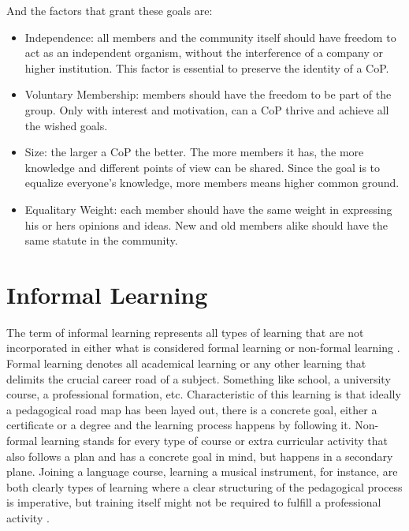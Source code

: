 And the factors that grant these goals are:
\begin{itemize}
    \item Independence: all members and the community itself should have freedom to
        act as an independent organism, without the interference of a company or  
        higher institution. This factor is essential to preserve the identity of a CoP.
    \item Voluntary Membership: members should have the freedom to be part of the 
        group. Only with interest and motivation, can a CoP thrive and achieve all
        the wished goals.
    \item Size: the larger a CoP the better. The more members it has, the more 
        knowledge and different points of view can be shared. Since the goal is to
        equalize everyone's knowledge, more members means higher common ground.
    \item Equalitary Weight: each member should have the same weight in expressing
        his or hers opinions and ideas. New and old members alike should have the 
        same statute in the community.
\end{itemize}



\section{Informal Learning}
\label{section:informal_learning}


The term of informal learning represents all types of learning that are not 
incorporated in either what is considered formal learning or non-formal learning
\cite{dewey_1938}.
Formal learning denotes all academical learning or any other learning that delimits 
the crucial career road of a subject. Something like school, a university course, 
a professional formation, etc. Characteristic of this learning is that ideally 
a pedagogical road map has been layed out, there is a concrete goal, either a 
certificate or a degree and the learning process happens by following it.
Non-formal learning stands for every type of course or extra curricular activity that
also follows a plan and has a concrete goal in mind, but happens in a secondary plane.
Joining a language course, learning a musical instrument, for instance, are both
clearly types of learning where a clear structuring of the pedagogical process is
imperative, but training itself might not be required to fulfill a professional 
activity \cite{adultsinformallearning}.


